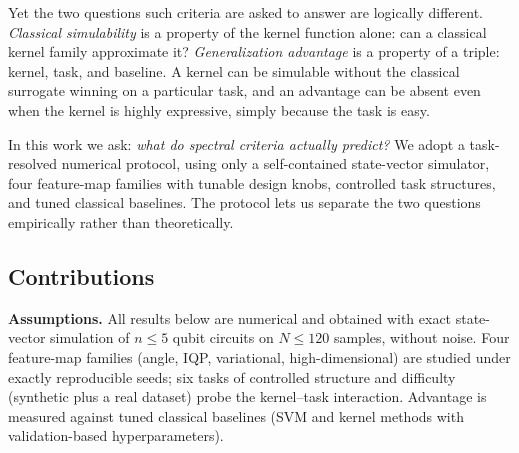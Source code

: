 \documentclass[a4paper,unpublished,onecolumn,nopdfoutputerror,12pt]{quantumarticle}
\begin{document}
Yet the two questions such criteria are asked to answer are logically different.
\emph{Classical simulability} is a property of the kernel function alone: can a
classical kernel family approximate it? \emph{Generalization advantage} is a property
of a triple: kernel, task, and baseline. A kernel can be simulable without the
classical surrogate winning on a particular task, and an advantage can be absent even
when the kernel is highly expressive, simply because the task is easy.

In this work we ask: \emph{what do spectral criteria actually predict?} We adopt a
task-resolved numerical protocol, using only a self-contained state-vector simulator,
four feature-map families with tunable design knobs, controlled task structures, and
tuned classical baselines. The protocol lets us separate the two questions empirically
rather than theoretically.

\subsection{Contributions}
\label{sec:contrib}

\textbf{Assumptions.} All results below are numerical and obtained with exact
state-vector simulation of $n\le5$ qubit circuits on $N\le120$ samples, without noise.
Four feature-map families (angle, IQP, variational, high-dimensional) are studied under
exactly reproducible seeds; six tasks of controlled structure and difficulty
(synthetic plus a real dataset) probe the kernel--task interaction. Advantage is
measured against tuned classical baselines (SVM and kernel methods with validation-based
hyperparameters).
\end{document}
